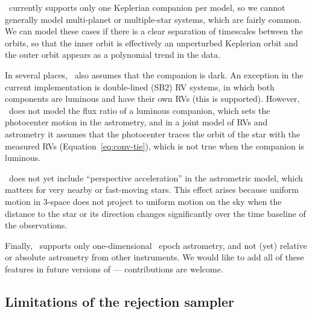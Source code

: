 \documentclass[twocolumn]{AASTeX7/aastex701}
\newcommand{\harv}{\package{harv}}
\begin{document}
\harv\ currently supports only one Keplerian companion per model, so we cannot generally
model multi-planet or multiple-star systems, which are fairly common.
We can model these cases if there is a clear separation of timescales between the
orbits, so that the inner orbit is effectively an unperturbed Keplerian orbit and the
outer orbit appears as a polynomial trend in the data.

In several places, \harv\ also assumes that the companion is dark.
An exception in the current implementation is double-lined (SB2) RV systems, in which
both components are luminous and have their own RVs (this is supported).
However, \harv\ does not model the flux ratio of a luminous companion, which sets the
photocenter motion in the astrometry, and in a joint model of RVs and astrometry it
assumes that the photocenter traces the orbit of the star with the measured RVs
(Equation~\ref{eq:conv-tie}), which is not true when the companion is luminous.

\harv\ does not yet include ``perspective acceleration'' in the astrometric model, which
matters for very nearby or fast-moving stars.
This effect arises because uniform motion in 3-space does not project to uniform motion
on the sky when the distance to the star or its direction changes significantly over the
time baseline of the observations.

Finally, \harv\ supports only one-dimensional \gaia\ epoch astrometry, and not (yet)
relative or absolute astrometry from other instruments.
We would like to add all of these features in future versions of \harv --- contributions
are welcome.


\subsection{Limitations of the rejection sampler}
\label{sec:discussion-rejection}

\end{document}
